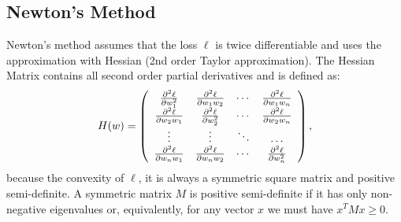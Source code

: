 \subsection{Newton's Method}
Newton's method assumes that the loss $\ell$ is twice differentiable and uses the approximation 
with Hessian (2nd order Taylor approximation).
The Hessian Matrix contains all second order partial derivatives and is defined as:
\begin{equation}
	\label{equ:hessian}
	H(w) = \left( \begin{array}{c c c c}
		\frac{\partial^{2}\ell}{\partial w_{1}^{2}}&
		\frac{\partial^{2}\ell}{\partial w_{1}w_{2}}& \cdots&
		\frac{\partial^{2}\ell}{\partial w_{1}w_{n}}\\

		\frac{\partial^{2}\ell}{\partial w_{2}w_{1}}&
		\frac{\partial^{2}\ell}{\partial w_{2}^{2}}& \cdots&
		\frac{\partial^{2}\ell}{\partial w_{2}w_{n}}\\

		\vdots& \vdots& \ddots& \hdots\\

		\frac{\partial^{2}\ell}{\partial w_{n}w_{1}}&
		\frac{\partial^{2}\ell}{\partial w_{n}w_{2}}& \cdots&
		\frac{\partial^{2}\ell}{\partial w_{n}^{2}}\\
	\end{array} \right),
\end{equation}
because the convexity of $\ell$, it is always a symmetric square matrix and positive
semi-definite. 
A symmetric matrix $M$ is positive semi-definite if it has only non-negative eigenvalues or, 
equivalently, for any vector $x$ we must have $x^{T}Mx\geq 0$.

